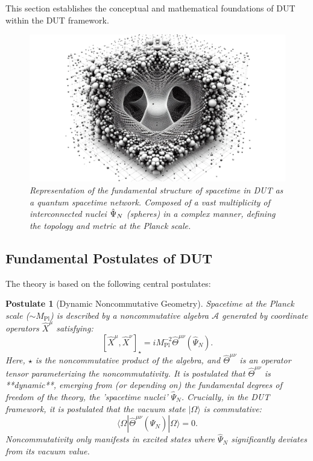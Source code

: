 \documentclass[11pt, a4paper]{article}
\newtheorem{postulate}{Postulate}
\theoremstyle{remark}
\newcommand{\Op}[1]{\hat{#1}}
\newcommand{\Mpl}{M_{\mathrm{Pl}}}
\begin{document}
This section establishes the conceptual and mathematical foundations of DUT within the DUT framework.

\begin{figure}[htbp]
    \centering
    \includegraphics[width=0.6\linewidth]{OIG9.ZNLJ.PNG}
    \caption{%
       \footnotesize\textit{Representation of the fundamental structure of spacetime in DUT as a quantum spacetime network. Composed of a vast multiplicity of interconnected nuclei \(\protect\Op{\Psi}_N\) (spheres) in a complex manner, defining the topology and metric at the Planck scale.}
    }
    \label{fig:Figura4}
\end{figure}

\subsection{Fundamental Postulates of DUT }
\label{subsec:postulates_final}

The theory is based on the following central postulates:

\begin{postulate}[Dynamic Noncommutative Geometry]
    \label{post:gnc_final}
    Spacetime at the Planck scale (\(\sim \Mpl\)) is described by a noncommutative algebra \( \mathcal{A} \) generated by coordinate operators \( \hat{X}^{\mu} \) satisfying:
    \begin{equation} \label{eq:conmutador_nc_final}
    [\hat{X}^{\mu}, \hat{X}^{\nu}]_{\star} = i\Mpl^{-2} \Op{\Theta}^{\mu\nu}(\Op{\Psi}_N).
    \end{equation}
    Here, \( \star \) is the noncommutative product of the algebra, and \( \Op{\Theta}^{\mu\nu} \) is an operator tensor parameterizing the noncommutativity. It is postulated that \( \Op{\Theta}^{\mu\nu} \) is **dynamic**, emerging from (or depending on) the fundamental degrees of freedom of the theory, the 'spacetime nuclei' \( \Op{\Psi}_N \). Crucially, in the DUT framework, it is postulated that the vacuum state \( |\Omega\rangle \) is commutative:
    \[ \langle\Omega| \Op{\Theta}^{\mu\nu}(\Op{\Psi}_N) |\Omega\rangle = 0. \]
    Noncommutativity only manifests in excited states where \( \Op{\Psi}_N \) significantly deviates from its vacuum value.
\end{postulate}
\end{document}
